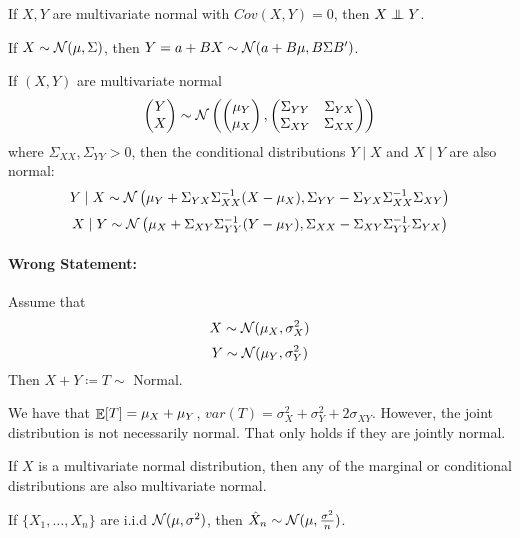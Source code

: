 \documentclass[10pt]{article}
\begin{document}
\begin{theorem}
	If $X,Y$ are multivariate normal with $Cov(X,Y) = 0$, then $X \perp \hspace{-1.4ex} \perp Y$.
\end{theorem}

\begin{theorem}
	If $X \sim \mathcal{N}(\mu,\Sigma)$, then $Y = a + BX \sim \mathcal{N}(a + B\mu,B\Sigma B')$.
\end{theorem}

\begin{theorem}
	If $(X,Y)$ are multivariate normal
	\[
	\begin{pmatrix} Y \\ X \end{pmatrix} \sim \mathcal{N}\left(\begin{pmatrix}\mu_Y \\ \mu_X\end{pmatrix} , \begin{pmatrix} \Sigma_{YY} & \Sigma_{YX} \\ \Sigma_{XY} & \Sigma_{XX}\end{pmatrix} \right)
	\]
	where $\Sigma_{XX},\Sigma_{YY} > 0$, then the conditional distributions $Y \mid X$ and $X \mid Y$ are also normal:
	\[
	Y \mid X \sim \mathcal{N}\left(\mu_Y + \Sigma_{YX} \Sigma_{XX}^{-1}(X - \mu_X),\Sigma_{YY} - \Sigma_{YX}\Sigma_{XX}^{-1}\Sigma_{XY} \right)
	\]
	\[
	X \mid Y \sim \mathcal{N}\left(\mu_X + \Sigma_{XY} \Sigma_{YY}^{-1}(Y - \mu_Y),\Sigma_{XX} - \Sigma_{XY}\Sigma_{YY}^{-1}\Sigma_{YX} \right)
	\]
\end{theorem}

\paragraph{Wrong Statement:} Assume that 
\[
X \sim \mathcal{N}(\mu_X,\sigma_X^2)
\]
\[
Y \sim \mathcal{N}(\mu_Y,\sigma_Y^2)
\]
Then $X + Y \coloneqq T \sim $ Normal.

\begin{remark}
We have that $\mathop{\mathbb{E}}[T] = \mu_X + \mu_Y$, $var(T) = \sigma_X^2 + \sigma_Y^2 + 2\sigma_{XY}$. However, the joint distribution is not necessarily normal. That only holds if they are jointly normal.
\end{remark}

\begin{proposition}
	If $X$ is a multivariate normal distribution, then any of the marginal or conditional distributions are also multivariate normal.
\end{proposition}

\begin{theorem}
	If $\{X_1,\dots,X_n\}$ are i.i.d $\mathcal{N}(\mu,\sigma^2)$, then $\hat{X}_n \sim \mathcal{N}(\mu,\frac{\sigma^2}{n})$.
\end{theorem}
\end{document}
